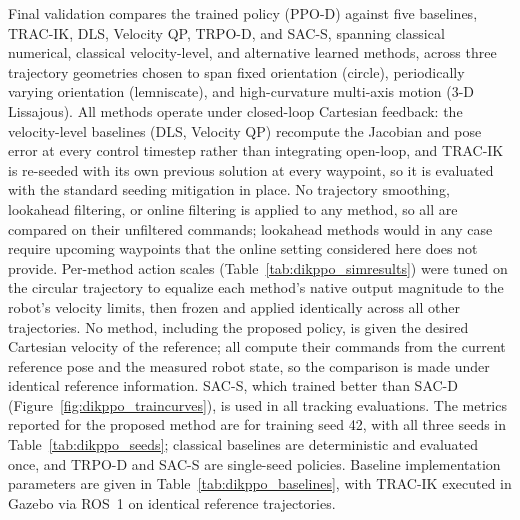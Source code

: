 Final validation compares the trained policy (PPO-D) against five baselines, TRAC-IK, DLS, Velocity
QP, TRPO-D, and SAC-S, spanning classical numerical, classical velocity-level, and alternative
learned methods, across three trajectory geometries chosen to span fixed orientation (circle),
periodically varying orientation (lemniscate), and high-curvature multi-axis motion (3-D
Lissajous). All methods operate under closed-loop Cartesian feedback: the velocity-level baselines
(DLS, Velocity QP) recompute the Jacobian and pose error at every control timestep rather than
integrating open-loop, and TRAC-IK is re-seeded with its own previous solution at every waypoint, so
it is evaluated with the standard seeding mitigation in place. No trajectory smoothing, lookahead
filtering, or online filtering is applied to any method, so all are compared on their unfiltered
commands; lookahead methods would in any case require upcoming waypoints that the online setting
considered here does not provide. Per-method action scales
(Table~\ref{tab:dikppo_simresults}) were tuned on the circular trajectory to equalize each method's
native output magnitude to the robot's velocity limits, then frozen and applied identically across
all other trajectories. No method, including the proposed policy, is given the desired Cartesian
velocity of the reference; all compute their commands from the current reference pose and the
measured robot state, so the comparison is made under identical reference information. SAC-S, which
trained better than SAC-D (Figure~\ref{fig:dikppo_traincurves}), is used in all tracking
evaluations. The metrics reported for the proposed method are for training seed 42, with all three
seeds in Table~\ref{tab:dikppo_seeds}; classical baselines are deterministic and evaluated once,
and TRPO-D and SAC-S are single-seed policies. Baseline implementation parameters are given in
Table~\ref{tab:dikppo_baselines}, with TRAC-IK executed in Gazebo via ROS~1 on identical reference
trajectories.


